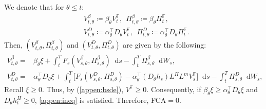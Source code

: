 \documentclass[a4paper, 11pt]{article}              %
\numberwithin{equation}{section}
\theoremstyle{plain}
\newcommand{\1}{\mathds{1}}
\newcommand{\dsF}{\mathbb{F}}
\theoremstyle{plain}
\theoremstyle{definition}
\theoremstyle{plain}
\newcommand*\df{\mathop{}\!\mathrm{d}}
\begin{document}
We denote that for $\theta \leq t$:
\begin{eqnarray}
  &V^\beta_{t, \theta} \coloneqq \beta_\theta V^\dsF_t, ~~ \Pi^\beta_{t, \theta} \coloneqq \beta_\theta
    \Pi^\dsF_t,\nonumber \\
  &V^D_{t, \theta} \coloneqq \alpha_\theta^\top D_\theta V^\dsF_t, ~~ \Pi^D_{t, \theta} \coloneqq \alpha^\top_\theta D_\theta
    \Pi^\dsF_t . \nonumber 
\end{eqnarray}
Then, $(V^\beta_{t, \theta}, \Pi^\beta_{t, \theta})$ and $(V^D_{t, \theta}, \Pi^D_{t, \theta})$ are given by the following:
\begin{align}
 V^\beta_{t, \theta} =&\beta_\theta\xi +\int_{t}^{T} F_s(V^\beta_{s, \theta}, \Pi^\beta_{s, \theta})\df s
               -\int_{t}^{T}\Pi^\beta_{s, \theta}\df W_s,\nonumber \\
  V^D_{t, \theta} =&\alpha_\theta^\top D_\theta\xi +\int_{t}^{T} \big[F_s(V^D_{s, \theta}, \Pi^D_{s, \theta})
                -\alpha_\theta^\top (D_\theta h_s)L^HL^m V^\dsF_s\big]\df s
                -\int_{t}^{T}\Pi^D_{s, \theta}\df W_s, \nonumber 
\end{align}
Recall $\xi \geq0$. Thus, by (\ref{appen:bsde}), $V^\dsF \geq0$. Consequently, if
$\beta_\theta\xi \geq \alpha_\theta^\top D_\theta\xi$ and $D_\theta h^H_t \geq 0$, \cref{appen:ineq} is satisfied. Therefore,
FCA$=0$.  
\end{document}

